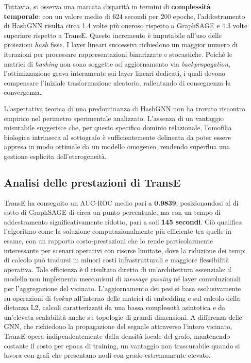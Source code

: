 Tuttavia, si osserva una marcata disparità in termini di \textbf{complessità temporale}: con un valore medio di 624 secondi per 200 epoche, l'addestramento di HashGNN risulta circa 1.4 volte più oneroso rispetto a GraphSAGE e 4.3 volte superiore rispetto a TransE. Questo incremento è imputabile all'uso delle proiezioni \textit{hash} fisse. I layer lineari successivi richiedono un maggior numero di iterazioni per processare rappresentazioni binarizzate e stocastiche. Poiché le matrici di \textit{hashing} non sono soggette ad aggiornamento via \textit{backpropagation}, l'ottimizzazione grava interamente sui layer lineari dedicati, i quali devono compensare l'iniziale trasformazione aleatoria, rallentando di conseguenza la convergenza.

L'aspettativa teorica di una predominanza di HashGNN non ha trovato riscontro empirico nel perimetro sperimentale analizzato. L'assenza di un vantaggio misurabile suggerisce che, per questo specifico dominio relazionale, l'omofilia biologica intrinseca al sottografo è sufficientemente delineata da poter essere appresa in modo ottimale da un modello omogeneo, rendendo superflua una gestione esplicita dell'eterogeneità.

\subsection{Analisi delle prestazioni di TransE}

TransE ha conseguito un AUC-ROC medio pari a \textbf{0.9839}, posizionandosi al di sotto di GraphSAGE di circa un punto percentuale, ma con un tempo di addestramento significativamente ridotto, pari a soli \textbf{145 secondi}. Ciò qualifica l'algoritmo come la soluzione computazionalmente più efficiente tra quelle in esame, con un rapporto costo-prestazioni che lo rende particolarmente interessante per scenari operativi con risorse limitate, dove la riduzione dei tempi di calcolo può tradursi in minori costi infrastrutturali e maggiore flessibilità operativa. Tale efficienza è il risultato diretto di un'architettura essenziale: il modello non implementa meccanismi di \textit{message passing} né layer convoluzionali per l'aggregazione del vicinato. L'aggiornamento dei pesi si basa esclusivamente su operazioni di \textit{lookup} all'interno delle matrici di embedding e sul calcolo della distanza L2, calcoli caratterizzati da una bassa complessità asintotica e da un'elevata scalabilità anche su topologie di grandi dimensioni. A differenza delle GNN, che richiedono la propagazione del segnale attraverso l'intero vicinato, TransE opera indipendentemente dalla densità locale del grafo, mantenendo costante il costo per epoca di training, un vantaggio non trascurabile quando si lavora con grafi che presentano nodi con grado estremamente elevato.

